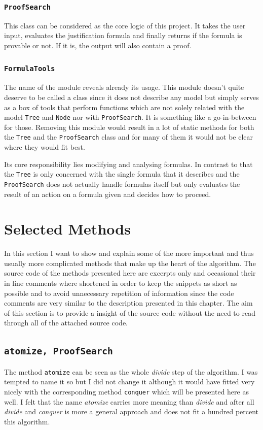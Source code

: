 \subsubsection[ProofSearch]{\texttt{ProofSearch}}
This class can be considered as the core logic of this project. It takes the user input, evaluates the justification formula and finally returns if the formula is provable or not. If it is, the output will also contain a proof.

\subsubsection[FormulaTools]{\texttt{FormulaTools}}
The name of the module reveals already its usage. This module doesn't quite deserve to be called a class since it does not describe any model but simply serves as a box of tools that perform functions which are not solely related with the model \texttt{Tree} and \texttt{Node} nor with \texttt{ProofSearch}. It is something like a go-in-between for those. Removing this module would result in a lot of static methods for both the \texttt{Tree} and the \texttt{ProofSearch} class and for many of them it would not be clear where they would fit best. 

Its core responsibility lies modifying and analysing formulas. In contrast to that the \texttt{Tree} is only concerned with the single formula that it describes and the \texttt{ProofSearch} does not actually handle formulas itself but only evaluates the result of an action on a formula given and decides how to proceed.


\section{Selected Methods}
In this section I want to show and explain some of the more important and thus usually more complicated methods that make up the heart of the algorithm. The source code of the methods presented here are excerpts only and occasional their in line comments where shortened in order to keep the snippets as short as possible and to avoid unnecessary repetition of information since the code comments are very similar to the description presented in this chapter. The aim of this section is to provide a insight of the source code without the need to read through all of the attached source code. 

\subsection[atomize]{\texttt{atomize, ProofSearch}}
The method \texttt{atomize} can be seen as the whole \emph{divide} step of the algorithm. I was tempted to name it so but I did not change it although it would have fitted very nicely with the corresponding method \texttt{conquer} which will be presented here as well. I felt that the name \emph{atomize} carries more meaning than \emph{divide} and after all \emph{divide} and \emph{conquer} is more a general approach and does not fit a hundred percent this algorithm.


